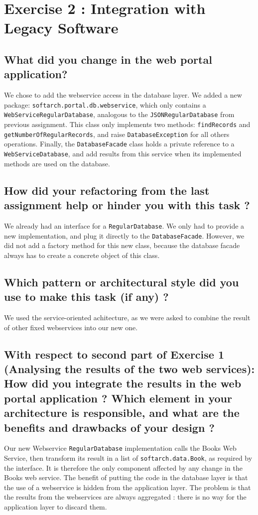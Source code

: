 \section{Exercise 2 : Integration with Legacy Software}
\subsection{What did you change in the web portal application?}
We chose to add the webservice access in the database layer. We added a new package: \texttt{softarch.portal.db.webservice}, which only contains a \texttt{WebServiceRegularDatabase}, analogous to the \texttt{JSONRegularDatabase} from previous assignment. This class only implements two methods: \texttt{findRecords} and \texttt{getNumberOfRegularRecords}, and raise \texttt{DatabaseException} for all others operations. Finally, the \texttt{DatabaseFacade} class holds a private reference to a \texttt{WebServiceDatabase}, and add results from this service when its implemented methods are used on the database.

\subsection{How did your refactoring from the last assignment help or hinder you with this task ?}
We already had an interface for a \texttt{RegularDatabase}. We only had to provide a new implementation, and plug it directly to the \texttt{DatabaseFacade}. However, we did not add a factory method for this new class, because the database facade always has to create a concrete object of this class.

\subsection{Which pattern or architectural style did you use to make this task (if any) ?}
We used the service-oriented achitecture, as we were asked to combine the result of other fixed webservices into our new one.

\subsection{With respect to second part of Exercise 1 (Analysing the results of the two web services): How did you integrate the results in the web portal application ?
Which element in your architecture is responsible, and what are the benefits and drawbacks of your design ?}
Our new Webservice \texttt{RegularDatabase} implementation calls the Books Web Service, then transform its result in a list of \texttt{softarch.data.Book}, as required by the interface. It is therefore the only component affected by any change in the Books web service.
The benefit of putting the code in the database layer is that the use of a webservice is hidden from the application layer. The problem is that the results from the webservices are always aggregated : there is no way for the application layer to discard them.

